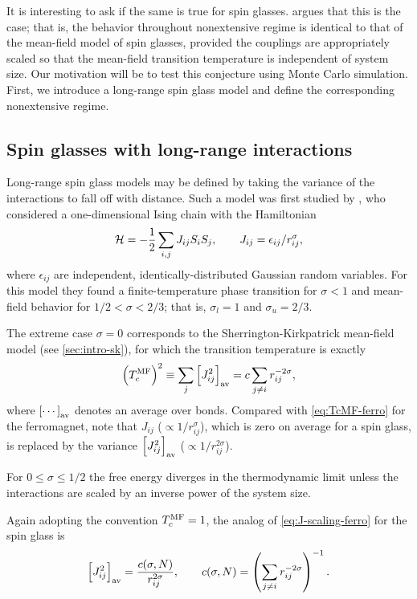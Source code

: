It is interesting to ask if the same is true for spin glasses.
\textcite{mori2011instability} argues that this is the case; that is, the
behavior throughout nonextensive regime is identical to that of the mean-field
model of spin glasses, provided the couplings are appropriately scaled so that
the mean-field transition temperature is independent of system size. Our
motivation will be to test this conjecture using Monte Carlo simulation. First,
we introduce a long-range spin glass model and define the corresponding
nonextensive regime.


\subsection{Spin glasses with long-range interactions}
\label{sec:nonextensive-lrsg}

Long-range spin glass models may be defined by taking the variance of the
interactions to fall off with distance. Such a model was first studied by
\textcite{kotliar1983one}, who considered a one-dimensional Ising chain with
the Hamiltonian
\begin{equation}
    \mathcal{H} = -\frac{1}{2} \sum_{i,j} J_{ij} S_i S_j,
    \qquad
    J_{ij} = \epsilon_{ij}/r_{ij}^\sigma,
\end{equation}
where $\epsilon_{ij}$ are independent, identically-distributed Gaussian random
variables. For this model they found a finite-temperature phase transition for
$\sigma<1$ and mean-field behavior for $1/2 < \sigma < 2/3$; that is,
$\sigma_l=1$ and $\sigma_u=2/3$.

The extreme case $\sigma=0$ corresponds to the Sherrington-Kirkpatrick
mean-field model (see \cref{sec:intro-sk}), for which the transition
temperature is exactly
\begin{equation}
  \left(T_c^{\mathrm{MF}}\right)^2 \equiv \sum_j \left[J_{ij}^2\right]_{\mathrm{av}} = c \sum_{j \neq i} r_{ij}^{-2\sigma},
\end{equation}
where $\left[\cdots\right]_{\mathrm{av}}$ denotes an average over bonds. Compared with
\cref{eq:TcMF-ferro} for the ferromagnet, note that $J_{ij}$ ($\propto
1/r_{ij}^{\sigma}$), which is zero on average for a spin glass, is replaced by
the variance $\left[J_{ij}^2\right]_{\mathrm{av}}$ ($\propto 1/r_{ij}^{2 \sigma}$).

For $0 \leq \sigma \leq 1/2$ the free energy diverges in the thermodynamic
limit unless the interactions are scaled by an inverse power of the system
size.

Again adopting the convention $T_c^{\mathrm{MF}}=1$, the analog of
\cref{eq:J-scaling-ferro} for the spin glass is
\begin{equation}
  \left[J_{ij}^2\right]_{\mathrm{av}} = \frac{c(\sigma, N)}{r_{ij}^{2\sigma}},
  \qquad
  c(\sigma, N) = \left(\sum_{j \neq i} r_{ij}^{-2\sigma}\right)^{-1}.
\end{equation}

